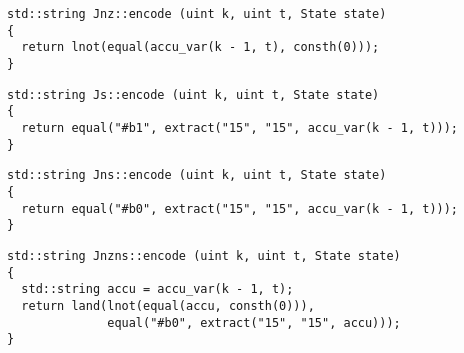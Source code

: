 
\begin{lstlisting}[style=c++]
std::string Jnz::encode (uint k, uint t, State state)
{
  return lnot(equal(accu_var(k - 1, t), consth(0)));
}
\end{lstlisting}


\begin{lstlisting}[style=c++]
std::string Js::encode (uint k, uint t, State state)
{
  return equal("#b1", extract("15", "15", accu_var(k - 1, t)));
}
\end{lstlisting}


\newpage

\begin{lstlisting}[style=c++]
std::string Jns::encode (uint k, uint t, State state)
{
  return equal("#b0", extract("15", "15", accu_var(k - 1, t)));
}
\end{lstlisting}


\begin{lstlisting}[style=c++]
std::string Jnzns::encode (uint k, uint t, State state)
{
  std::string accu = accu_var(k - 1, t);
  return land(lnot(equal(accu, consth(0))),
              equal("#b0", extract("15", "15", accu)));
}
\end{lstlisting}

